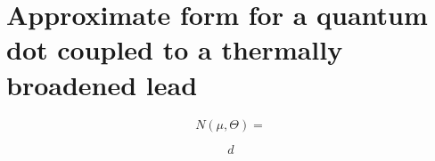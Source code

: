 \section{Approximate form for a quantum dot coupled to a thermally broadened lead}

\begin{equation}
	\label{eqn:occupation}
	N(\mu, \Theta) = 
\end{equation}

\begin{equation}
	\label{eqn:dndt}
	d
\end{equation}

\endinput

Any text after an \endinput is ignored.
You could put scraps here or things in progress.
